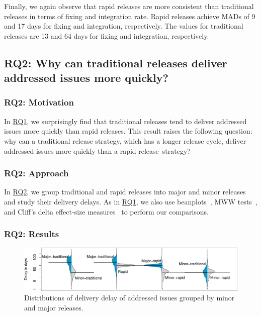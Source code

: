 Finally, we again observe that rapid releases are more consistent than
traditional releases in terms of fixing and integration rate. Rapid releases
achieve MADs of 9 and 17 days for fixing and integration, respectively. The
values for traditional releases are 13 and 64 days for fixing and integration,
respectively.\\ 


\subsection{RQ2: Why can traditional releases deliver addressed issues
more quickly?}\label{ch5:rq2} 

\subsubsection*{RQ2: Motivation} 

In \hyperref[ch5:rq1]{RQ1}, we surprisingly find that traditional releases tend
to deliver addressed issues more quickly than rapid releases. This result raises
the following question: why can a traditional release strategy, which has a
longer release cycle, deliver addressed issues more quickly than a rapid
release~strategy?\\

\subsubsection*{RQ2: Approach}

In \hyperref[ch5:rq2]{RQ2}, we group traditional and rapid releases into major
and minor releases and study their delivery delays. As in
\hyperref[ch5:rq1]{RQ1}, we also use beanplots~\cite{kampstra2008beanplot}, MWW
tests~\cite{wilks2011statistical}, and Cliff's delta effect-size
measures~\cite{cliff1993dominance} to perform our comparisons.

\subsubsection*{RQ2: Results}

\begin{figure}[t!]
	\centering
	\includegraphics[width=\textwidth,keepaspectratio]
	{chapters/chapter5/figures/rq2/major_vs_minor.pdf}
	\caption{
		Distributions of delivery delay of addressed issues grouped by minor and major
		releases.
	}
	\label{fig:major_vs_minor}
\end{figure}

